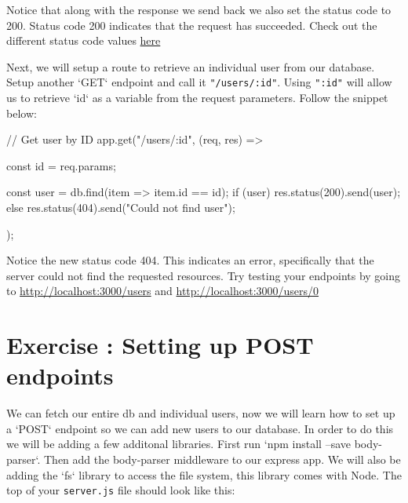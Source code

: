 \documentclass{42-en}
\begin{document}
Notice that along with the response we send back we also set the status code to 200. Status code 200 indicates that the request has succeeded. Check out the different status code values \href{https://developer.mozilla.org/en-US/docs/Web/HTTP/Status}{here} 

Next, we will setup a route to retrieve an individual user from our database. Setup another `GET` endpoint and call it \texttt{"/users/:id"}. Using \texttt{":id"} will allow us to retrieve `id` as a variable from the request parameters. Follow the snippet below:
	\begin{42jscode}
	// Get user by ID
	app.get("/users/:id", (req, res) => {
	const { id } = req.params;

	const user = db.find(item => item.id == id);
	if (user) {
		res.status(200).send(user);
	} else {
		res.status(404).send("Could not find user");
	}
	});
	\end{42jscode}

Notice the new status code 404. This indicates an error, specifically that the server could not find the requested resources. Try testing your endpoints by going to \href{http://localhost:3000/users}{http://localhost:3000/users} and \href{http://localhost:3000/users/0}{http://localhost:3000/users/0}

\newpage
\nextexercice

\chapter{Exercise \exercicenumber: Setting up POST endpoints}

We can fetch our entire db and individual users, now we will learn how to set up a `POST` endpoint so we can add new users to our database. In order to do this we will be adding a few additonal libraries. First run `npm install --save body-parser`. Then add the body-parser middleware to our express app. We will also be adding the `fs` library to access the file system, this library comes with Node. The top of your \texttt{server.js} file should look like this:
\end{document}
